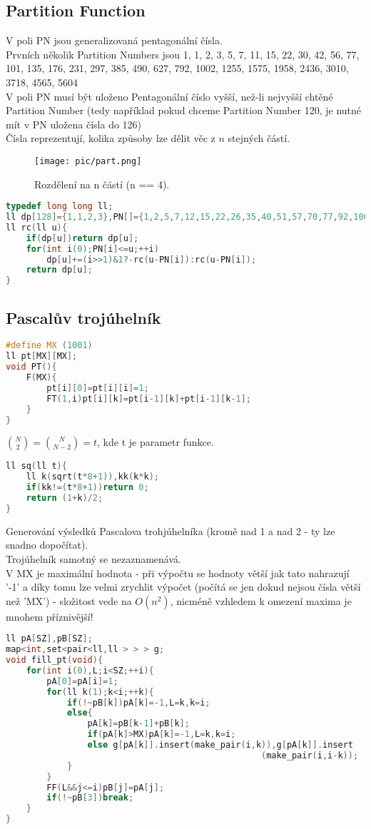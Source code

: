 \documentclass[11pt]{article}
\begin{document}
\subsection{Partition Function}
V poli \textsf{PN} jsou generalizovaná pentagonální čísla.
\\Prvních několik Partition Numbers jsou 1, 1, 2, 3, 5, 7, 11, 15, 22, 30, 42, 56, 77, 101, 135, 176, 231, 297, 385, 490, 627, 792, 1002, 1255, 1575, 1958, 2436, 3010, 3718, 4565, 5604
\\V poli \textsf{PN} musí být uloženo Pentagonální číslo vyšší, než-li nejvyšší chtěné Partition Number (tedy například pokud chceme Partition Number 120, je nutné mít v \textsf{PN} uložena čísla do 126)
\\Čísla reprezentují, kolika způsoby lze dělit věc z $n$ stejných částí.
\begin{figure}[H]
  \centering
  \texttt{[image: pic/part.png]}
  \caption[Rozdělení na n částí.]{Rozdělení na n částí (n == 4).}
\end{figure}
\begin{lstlisting}[language=C++]
typedef long long ll;
ll dp[128]={1,1,2,3},PN[]={1,2,5,7,12,15,22,26,35,40,51,57,70,77,92,100,117,126};
ll rc(ll u){
    if(dp[u])return dp[u];
    for(int i(0);PN[i]<=u;++i)
        dp[u]+=(i>>1)&1?-rc(u-PN[i]):rc(u-PN[i]);
    return dp[u];
}
\end{lstlisting}
\subsection{Pascalův trojúhelník}
\begin{lstlisting}[language=C++]
#define MX (1001)
ll pt[MX][MX];
void PT(){
    F(MX){
        pt[i][0]=pt[i][i]=1;
        FT(1,i)pt[i][k]=pt[i-1][k]+pt[i-1][k-1];
    }
}
\end{lstlisting}
${N\choose 2}={N\choose N-2}=t$, kde \textsf{t} je parametr funkce.
\begin{lstlisting}[language=C++]
ll sq(ll t){
    ll k(sqrt(t*8+1)),kk(k*k);
    if(kk!=(t*8+1))return 0;
    return (1+k)/2;
}
\end{lstlisting}
Generování výsledků Pascalova trohjúhelníka (kromě nad 1 a nad 2 - ty lze snadno dopočítat).
\\Trojúhelník samotný se nezaznamenává.
\\V \textsf{MX} je maximální hodnota - při výpočtu se hodnoty větší jak tato nahrazují '-1' a díky tomu lze velmi zrychlit výpočet (počítá se jen dokud nejsou čísla větší než 'MX') - složitost vede na $O(n^2)$, nicméně vzhledem k omezení maxima je mnohem příznivější!
\begin{lstlisting}[language=C++]
ll pA[SZ],pB[SZ];
map<int,set<pair<ll,ll > > > g;
void fill_pt(void){
    for(int i(0),L;i<SZ;++i){
        pA[0]=pA[i]=1;
        for(ll k(1);k<i;++k){
            if(!~pB[k])pA[k]=-1,L=k,k=i;
            else{
                pA[k]=pB[k-1]+pB[k];
                if(pA[k]>MX)pA[k]=-1,L=k,k=i;
                else g[pA[k]].insert(make_pair(i,k)),g[pA[k]].insert
                                                  (make_pair(i,i-k));
            }
        }
        FF(L&&j<=i)pB[j]=pA[j];
        if(!~pB[3])break;
    }
}
\end{lstlisting}
\end{document}
